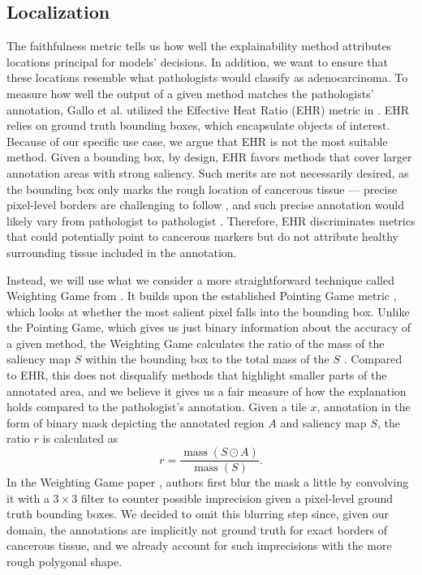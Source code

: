 \subsection*{Localization}

The faithfulness metric tells us how well the explainability method attributes locations principal for models' decisions.
In addition, we want to ensure that these locations resemble what pathologists would classify as adenocarcinoma.
To measure how well the output of a given method matches the pathologists' annotation, Gallo et al. utilized the Effective Heat Ratio (EHR) \cite{ehr} metric in \cite{gallo}.
EHR relies on ground truth bounding boxes, which encapsulate objects of interest.
Because of our specific use case, we argue that EHR is not the most suitable method.
Given a bounding box, by design, EHR favors methods that cover larger annotation areas with strong saliency.
Such merits are not necessarily desired, as the bounding box only marks the rough location of cancerous tissue --- precise pixel-level borders are challenging to follow \cite{gallo, annotation-agreement}, and such precise annotation would likely vary from pathologist to pathologist \cite{annotation-agreement}.
Therefore, EHR discriminates metrics that could potentially point to cancerous markers but do not attribute healthy surrounding tissue included in the annotation.

Instead, we will use what we consider a more straightforward technique called Weighting Game from \cite{weighting-game}.
It builds upon the established Pointing Game metric \cite{pointing-game}, which looks at whether the most salient pixel falls into the bounding box.
Unlike the Pointing Game, which gives us just binary information about the accuracy of a given method, the Weighting Game calculates the ratio of the mass of the saliency map $S$ within the bounding box to the total mass of the $S$ \cite{weighting-game}.
Compared to EHR, this does not disqualify methods that highlight smaller parts of the annotated area, and we believe it gives us a fair measure of how the explanation holds compared to the pathologist's annotation.
Given a tile $x$, annotation in the form of binary mask depicting the annotated region $A$ and saliency map $S$, the ratio $r$ is calculated as
\begin{equation}\label{eq:wg}
    r = \frac{\operatorname{\text{mass}}(S \odot A)}{\operatorname{\text{mass}}(S)}.
\end{equation}
In the Weighting Game paper \cite{weighting-game}, authors first blur the mask a little by convolving it with a $3 \times 3$ filter to counter possible imprecision given a pixel-level ground truth bounding boxes.
We decided to omit this blurring step since, given our domain, the annotations are implicitly not ground truth for exact borders of cancerous tissue, and we already account for such imprecisions with the more rough polygonal shape.

